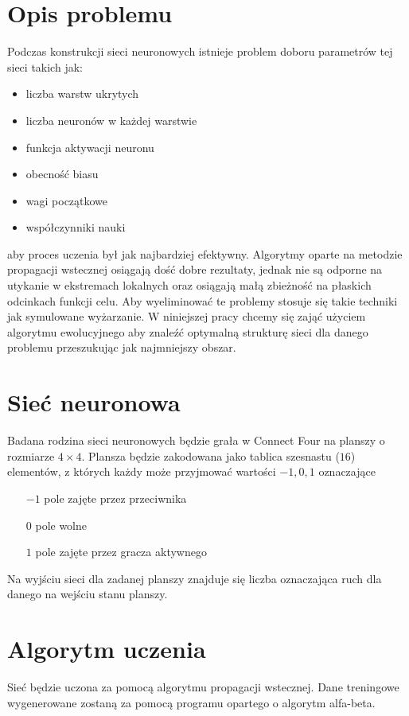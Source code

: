\documentclass{llncs}
\begin{document}
\section{Opis problemu}
Podczas konstrukcji sieci neuronowych istnieje problem doboru parametrów tej sieci takich jak:
\begin{itemize}
	\item liczba warstw ukrytych
	\item liczba neuronów w każdej warstwie
	\item funkcja aktywacji neuronu
	\item obecność biasu
	\item wagi początkowe
	\item współczynniki nauki
\end{itemize}
aby proces uczenia był jak najbardziej efektywny. Algorytmy oparte na metodzie propagacji wstecznej osiągają
dość dobre rezultaty, jednak nie są odporne na utykanie w ekstremach lokalnych oraz osiągają małą zbieżność
na płaskich odcinkach funkcji celu. Aby wyeliminować te problemy stosuje się takie techniki jak symulowane wyżarzanie.
W niniejszej pracy chcemy się zająć użyciem algorytmu ewolucyjnego aby znaleźć optymalną strukturę sieci
dla danego problemu przeszukując jak najmniejszy obszar.

\section{Sieć neuronowa}
Badana rodzina sieci neuronowych będzie grała w Connect Four na planszy o rozmiarze $4 \times 4$. Plansza będzie zakodowana
jako tablica szesnastu ($16$) elementów, z których każdy może przyjmować wartości $-1,0,1$ oznaczające
\begin{itemize}
	\item[$-1$] pole zajęte przez przeciwnika
	\item[$0$] pole wolne
	\item[$1$] pole zajęte przez gracza aktywnego
\end{itemize}
Na wyjściu sieci dla zadanej planszy znajduje się liczba oznaczająca ruch dla danego na wejściu stanu planszy.

\section{Algorytm uczenia}
Sieć będzie uczona za pomocą algorytmu propagacji wstecznej. Dane treningowe wygenerowane zostaną za pomocą programu
opartego o algorytm alfa-beta.
\end{document}

